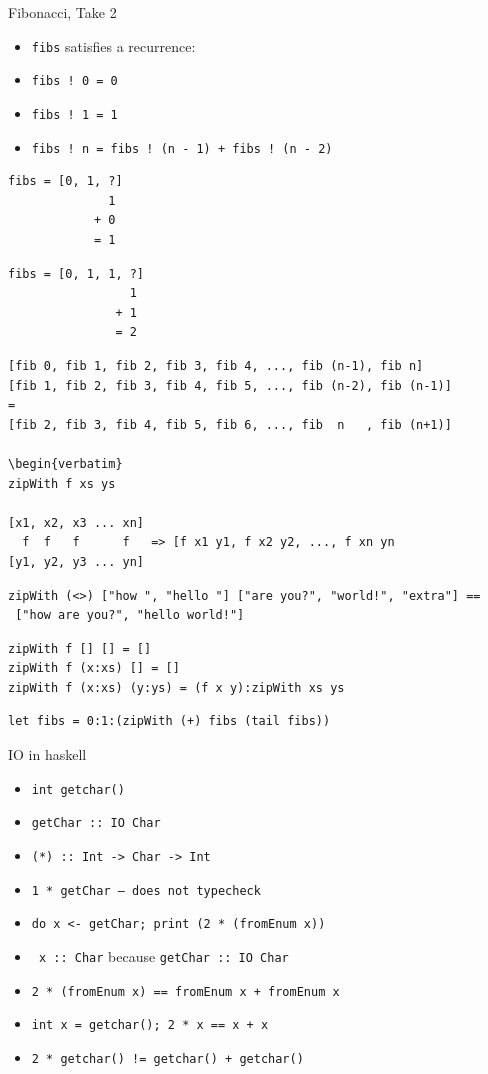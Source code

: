 \documentclass[8pt]{beamer}
\newcommand{\cpp}[1]{\texttt{#1}}
\newcommand{\hs}[1]{\texttt{#1}}
\begin{document}
\begin{frame}[fragile]{Fibonacci, Take 2}
\begin{itemize}
    \item \hs{fibs} satisfies a recurrence:
    \item \hs{fibs ! 0 = 0}
    \item \hs{fibs ! 1 = 1}
    \item \hs{fibs ! n = fibs ! (n - 1) + fibs ! (n - 2)}
\end{itemize}
\pause

\begin{verbatim}
fibs = [0, 1, ?]
              1
            + 0
            = 1
\end{verbatim}
\pause
\begin{verbatim}
fibs = [0, 1, 1, ?]
                 1
               + 1
               = 2
\end{verbatim}
\pause
\begin{verbatim}
[fib 0, fib 1, fib 2, fib 3, fib 4, ..., fib (n-1), fib n]  
[fib 1, fib 2, fib 3, fib 4, fib 5, ..., fib (n-2), fib (n-1)]
=
[fib 2, fib 3, fib 4, fib 5, fib 6, ..., fib  n   , fib (n+1)]

\begin{verbatim}
zipWith f xs ys

[x1, x2, x3 ... xn]
  f  f   f      f   => [f x1 y1, f x2 y2, ..., f xn yn
[y1, y2, y3 ... yn]
\end{verbatim}
\pause
\begin{verbatim}
zipWith (<>) ["how ", "hello "] ["are you?", "world!", "extra"] ==
 ["how are you?", "hello world!"]
\end{verbatim}
\pause
\begin{verbatim}
zipWith f [] [] = []
zipWith f (x:xs) [] = []
zipWith f (x:xs) (y:ys) = (f x y):zipWith xs ys
\end{verbatim}
\pause

\begin{verbatim}
let fibs = 0:1:(zipWith (+) fibs (tail fibs))
\end{verbatim}
\end{frame}

\begin{frame}[fragile]{IO in haskell}
\begin{itemize}
    \item \cpp{int getchar()} \pause
    \item \hs{getChar :: IO Char} \pause
    \item \hs{(*) :: Int -> Char -> Int} \pause
    \item \hs{1 * getChar -- does not typecheck} \pause
    \item \hs{do x <- getChar; print (2 * (fromEnum x))} \pause
    \item \hs{  x :: Char} because \hs{getChar :: IO Char}
    \item \hs{2 * (fromEnum x) == fromEnum x + fromEnum x}\pause
    \item \cpp{int x = getchar(); 2 * x == x + x}\pause
    \item \cpp{2 * getchar() != getchar() + getchar()}
\end{itemize}
\end{frame}
\end{document}
